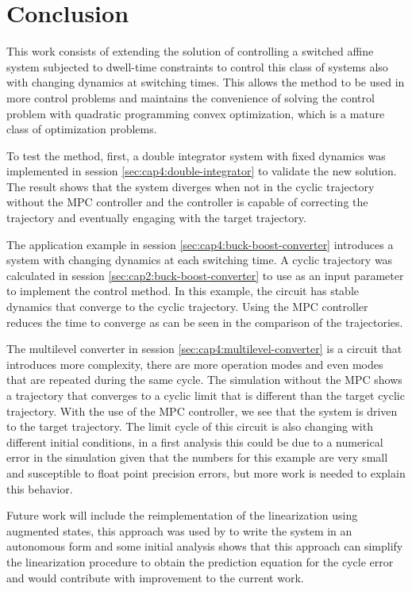 \chapter{Conclusion}

This work consists of extending the solution of controlling a switched affine system 
subjected to dwell-time constraints to control this class of systems also with changing 
dynamics at switching times. This allows the method to be used in more control problems 
and maintains the convenience of solving the control problem with quadratic programming 
convex optimization, which is a mature class of optimization problems.

To test the method, first, a double integrator system with fixed dynamics was implemented in session \ref{sec:cap4:double-integrator}
to validate the new solution. The result shows that the system diverges when not in the cyclic trajectory without the MPC controller and 
the controller is capable of correcting the trajectory and eventually engaging with the target trajectory.

The application example in session \ref{sec:cap4:buck-boost-converter} introduces a system with changing dynamics at each switching time. 
A cyclic trajectory was calculated in session \ref{sec:cap2:buck-boost-converter} to use as an input parameter to implement the control method.
In this example, the circuit has stable dynamics that converge to the cyclic trajectory. Using the MPC controller reduces the time to converge
as can be seen in the comparison of the trajectories.

The multilevel converter in session \ref{sec:cap4:multilevel-converter} is a circuit that 
introduces more complexity, there are more operation modes and even modes that are repeated
during the same cycle. The simulation without the MPC shows a trajectory that converges to a cyclic limit 
that is different than the target cyclic trajectory. With the use of the MPC controller, we see that the system 
is driven to the target trajectory. The limit cycle of this circuit is also changing with different initial conditions,
in a first analysis this could be due to a numerical error in the simulation given that the numbers for this example 
are very small and susceptible to float point precision errors, but more work is needed to explain this behavior.

Future work will include the reimplementation of the linearization using augmented states, 
this approach was used by  to write the system in an 
autonomous form and some initial analysis shows that this approach can simplify the 
linearization procedure to obtain the prediction equation for the cycle error and would 
contribute with improvement to the current work.

